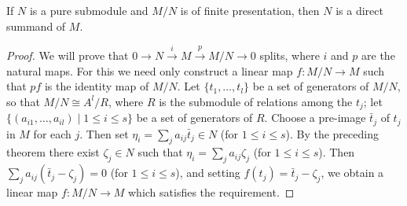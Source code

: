 \begin{theorem}\label{thm:7.14}
If $N$ is a pure submodule and $M/N$ is of finite presentation,
then $N$ is a direct summand of $M$.
\end{theorem}

\begin{proof}
We will prove that $0 \to N \xrightarrow{i} M \xrightarrow{p} M/N \to 0$ splits, where $i$
and $p$ are the natural maps. For this we need only construct a linear map
$f\colon M/N \to M$ such that $pf$ is the identity map of $M/N$. Let $\{t_1, \ldots, t_l\}$
be a set of generators of $M/N$, so that $M/N \cong A^l/R$, where $R$ is the
submodule of relations among the $t_j$; let $\{(a_{i1}, \ldots, a_{il}) \mid 1 \le i \le s\}$ be a
set of generators of $R$. Choose a pre-image $\bar{t}_j$ of $t_j$ in $M$ for each $j$. Then
set $\eta_i = \sum_j a_{ij}\bar{t}_j \in N$ (for $1 \le i \le s$). By the preceding theorem there exist
$\zeta_j \in N$ such that $\eta_i = \sum_j a_{ij}\zeta_j$ (for $1 \le i \le s$). Then $\sum_j a_{ij}(\bar{t}_j - \zeta_j) = 0$ (for
$1 \le i \le s$), and setting $f(t_j) = \bar{t}_j - \zeta_j$, we obtain a linear map $f\colon M/N \to M$
which satisfies the requirement.
\end{proof}
